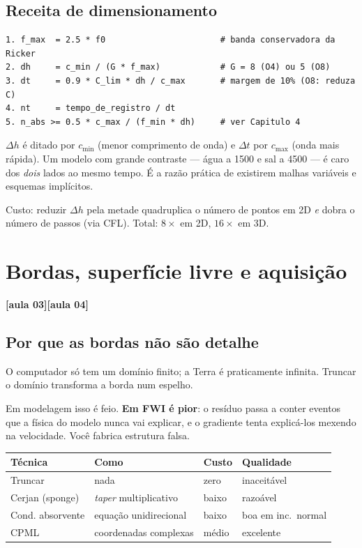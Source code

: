 \documentclass[11pt,a4paper,oneside]{report}
\newcommand{\aula}[1]{\textcolor{cianofwi}{\textbf{[aula #1]}}}
\begin{document}
\section{Receita de dimensionamento}

\begin{lstlisting}
1. f_max  = 2.5 * f0                       # banda conservadora da Ricker
2. dh     = c_min / (G * f_max)            # G = 8 (O4) ou 5 (O8)
3. dt     = 0.9 * C_lim * dh / c_max       # margem de 10% (O8: reduza C)
4. nt     = tempo_de_registro / dt
5. n_abs >= 0.5 * c_max / (f_min * dh)     # ver Capitulo 4
\end{lstlisting}

\begin{atencao}
$\Delta h$ é ditado por $c_{\min}$ (menor comprimento de onda) e $\Delta t$
por $c_{\max}$ (onda mais rápida). Um modelo com grande contraste --- água a
1500 e sal a 4500 --- é caro dos \emph{dois} lados ao mesmo tempo. É a razão
prática de existirem malhas variáveis e esquemas implícitos.
\end{atencao}

Custo: reduzir $\Delta h$ pela metade quadruplica o número de pontos em 2D
\emph{e} dobra o número de passos (via CFL). Total: $8\times$ em 2D,
$16\times$ em 3D.

\chapter{Bordas, superfície livre e aquisição}
\label{cap:bordas}

\aula{03}\quad\aula{04}

\section{Por que as bordas não são detalhe}

O computador só tem um domínio finito; a Terra é praticamente infinita.
Truncar o domínio transforma a borda num espelho.

Em modelagem isso é feio. \textbf{Em FWI é pior}: o resíduo passa a conter
eventos que a física do modelo nunca vai explicar, e o gradiente tenta
explicá-los mexendo na velocidade. Você fabrica estrutura falsa.

\begin{center}
\begin{tabular}{@{}llll@{}}
\toprule
\textbf{Técnica} & \textbf{Como} & \textbf{Custo} & \textbf{Qualidade} \\
\midrule
Truncar          & nada                     & zero  & inaceitável \\
Cerjan (sponge)  & \emph{taper} multiplicativo & baixo & razoável \\
Cond. absorvente & equação unidirecional    & baixo & boa em inc.\ normal \\
CPML             & coordenadas complexas    & médio & excelente \\
\bottomrule
\end{tabular}
\end{center}
\end{document}
